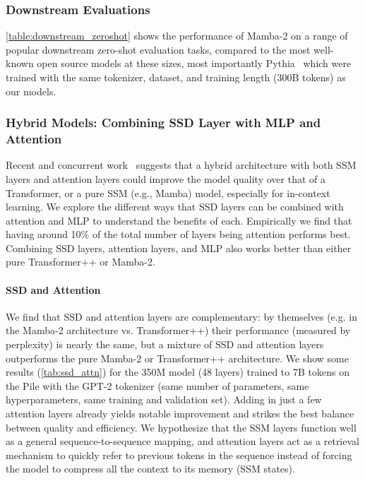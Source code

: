 \documentclass{article}
\newcommand{\citep}{\parencite}
\begin{document}
\subsubsection{Downstream Evaluations}

\cref{table:downstream_zeroshot} shows the performance of Mamba-2 on a range of popular downstream zero-shot evaluation tasks, compared to the most well-known open source models at these sizes,
most importantly Pythia~\citep{biderman2023pythia} which were trained with the same tokenizer, dataset, and training length (300B tokens) as our models.

\subsubsection{Hybrid Models: Combining SSD Layer with MLP and Attention}
\label{sec:hybrid}

Recent and concurrent work~\citep{dao2023hungry,de2024griffin,lieber2024jamba,glorioso2024zamba} suggests that a hybrid architecture with both SSM layers and
attention layers could improve the model quality over that of a Transformer, or a
pure SSM (e.g., Mamba) model, especially for in-context learning.
We explore the different ways that SSD layers can be combined with attention and
MLP to understand the benefits of each.
Empirically we find that having around 10\% of the total
number of layers being attention performs best.
Combining SSD layers, attention layers, and MLP also works better than either
pure Transformer++ or Mamba-2.

\paragraph{SSD and Attention}
We find that SSD and attention layers are complementary: by themselves (e.g.
in the Mamba-2 architecture vs. Transformer++) their performance (measured by
perplexity) is nearly the same, but a mixture of SSD and attention layers
outperforms the pure Mamba-2 or Transformer++ architecture. We show some results
(\cref{tab:ssd_attn}) for the 350M model (48 layers) trained to 7B tokens on the Pile with the GPT-2 tokenizer (same
number of parameters, same hyperparameters, same training and validation set).
Adding in just a few attention layers already yields notable improvement and
strikes the best balance between quality and efficiency. We hypothesize that
the SSM layers function well as a general sequence-to-sequence mapping, and
attention layers act as a retrieval mechanism to quickly refer to previous
tokens in the sequence instead of forcing the model to compress all the context
to its memory (SSM states).
\end{document}
